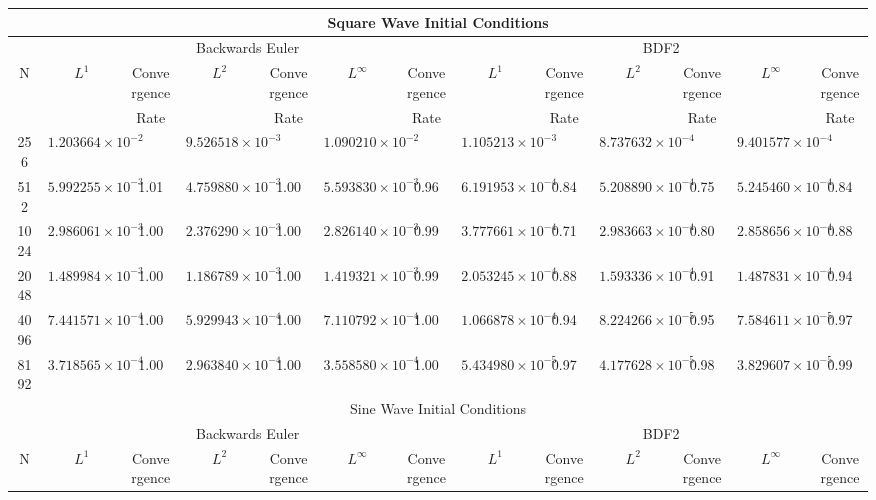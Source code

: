 \documentclass{article}
\begin{document}
  \thispagestyle{empty}
  \begin{tabular}[]{|c||c|c|c|c|c|c||c|c|c|c|c|c|}
    \hline
    \multicolumn{13}{|c|}{Square Wave Initial Conditions} 
    \\
    \hline
    &\multicolumn{6}{c||}{Backwards Euler}&\multicolumn{6}{c|}{BDF2} 
    \\
    \hline
    N&$L^{1}$&Convergence&$L^{2}$&Convergence&$L^{\infty}$&Convergence
     &$L^{1}$&Convergence&$L^{2}$&Convergence&$L^{\infty}$&Convergence 
    \\
    &&Rate&&Rate&&Rate&&Rate&&Rate&&Rate 
    \\
    \hline
    256&$1.203664\times{10}^{-2}$&&$9.526518\times{10}^{-3}$&&$1.090210\times{10}^{-2}$&
       &$1.105213\times{10}^{-3}$&&$8.737632\times{10}^{-4}$&&$9.401577\times{10}^{-4}$
    \\
    \hline
    512&$5.992255\times{10}^{-3}$&1.01&$4.759880\times{10}^{-3}$&1.00&$5.593830\times{10}^{-3}$&0.96
       &$6.191953\times{10}^{-4}$&0.84&$5.208890\times{10}^{-4}$&0.75&$5.245460\times{10}^{-4}$&0.84
    \\
    \hline
    1024&$2.986061\times{10}^{-3}$&1.00&$2.376290\times{10}^{-3}$&1.00&$2.826140\times{10}^{-3}$&0.99
        &$3.777661\times{10}^{-4}$&0.71&$2.983663\times{10}^{-4}$&0.80&$2.858656\times{10}^{-4}$&0.88
    \\
    \hline
    2048&$1.489984\times{10}^{-3}$&1.00&$1.186789\times{10}^{-3}$&1.00&$1.419321\times{10}^{-3}$&0.99
        &$2.053245\times{10}^{-4}$&0.88&$1.593336\times{10}^{-4}$&0.91&$1.487831\times{10}^{-4}$&0.94
    \\
    \hline
    4096&$7.441571\times{10}^{-4}$&1.00&$5.929943\times{10}^{-4}$&1.00&$7.110792\times{10}^{-4}$&1.00
        &$1.066878\times{10}^{-4}$&0.94&$8.224266\times{10}^{-5}$&0.95&$7.584611\times{10}^{-5}$&0.97
    \\
    \hline
    8192&$3.718565\times{10}^{-4}$&1.00&$2.963840\times{10}^{-4}$&1.00&$3.558580\times{10}^{-4}$&1.00
        &$5.434980\times{10}^{-5}$&0.97&$4.177628\times{10}^{-5}$&0.98&$3.829607\times{10}^{-5}$&0.99
    \\
    \hline
    \multicolumn{13}{|c|}{Sine Wave Initial Conditions} 
    \\
    \hline
    &\multicolumn{6}{c||}{Backwards Euler}&\multicolumn{6}{c|}{BDF2} 
    \\
    \hline
    N&$L^{1}$&Convergence&$L^{2}$&Convergence&$L^{\infty}$&Convergence
     &$L^{1}$&Convergence&$L^{2}$&Convergence&$L^{\infty}$&Convergence 
    \\

\end{tabular}
\end{document}
